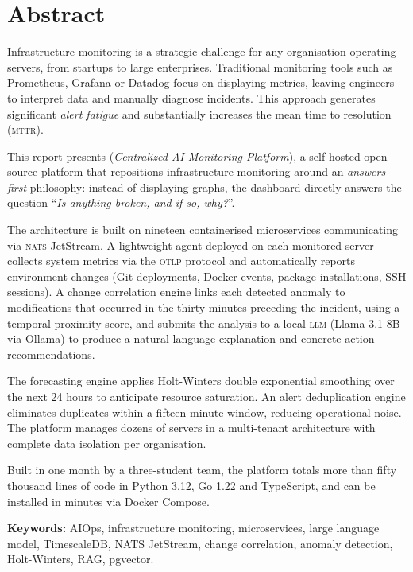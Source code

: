 \chapter*{Abstract}

\begin{infobox}[Abstract]
Infrastructure monitoring is a strategic challenge for any organisation operating
servers, from startups to large enterprises. Traditional monitoring tools such as
Prometheus, Grafana or Datadog focus on displaying metrics, leaving engineers
to interpret data and manually diagnose incidents. This approach generates
significant \textit{alert fatigue} and substantially increases the mean time to
resolution (\textsc{mttr}).

This report presents \textbf{\caimp{}} (\textit{Centralized AI Monitoring Platform}),
a self-hosted open-source platform that repositions infrastructure monitoring
around an \textit{answers-first} philosophy: instead of displaying graphs,
the dashboard directly answers the question ``\textit{Is anything broken,
and if so, why?}''.

The architecture is built on nineteen containerised microservices communicating
via \textsc{nats} JetStream. A lightweight agent deployed on each monitored server
collects system metrics via the \textsc{otlp} protocol and automatically reports
environment changes (Git deployments, Docker events, package installations, SSH
sessions). A change correlation engine links each detected anomaly to modifications
that occurred in the thirty minutes preceding the incident, using a temporal
proximity score, and submits the analysis to a local \textsc{llm}
(Llama 3.1 8B via Ollama) to produce a natural-language explanation and concrete
action recommendations.

The forecasting engine applies Holt-Winters double exponential smoothing over the
next 24 hours to anticipate resource saturation. An alert deduplication engine
eliminates duplicates within a fifteen-minute window, reducing operational noise.
The platform manages dozens of servers in a multi-tenant architecture with complete
data isolation per organisation.

Built in one month by a three-student team, the platform totals more than fifty
thousand lines of code in Python 3.12, Go 1.22 and TypeScript, and can be
installed in minutes via Docker Compose.
\end{infobox}

\medskip
\textbf{Keywords:} AIOps, infrastructure monitoring, microservices,
large language model, TimescaleDB, NATS JetStream, change correlation,
anomaly detection, Holt-Winters, RAG, pgvector.
